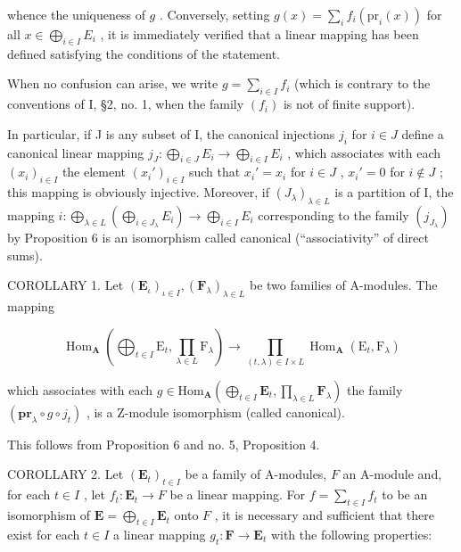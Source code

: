whence the uniqueness of \(g\) . Conversely, setting \(g(x) = \sum_{i} f_i(\mathrm{pr}_i(x))\) for all \(x \in \bigoplus_{i \in I} E_i\) , it is immediately verified that a linear mapping has been defined satisfying the conditions of the statement.

When no confusion can arise, we write \(g = \sum_{i \in I} f_i\) (which is contrary to the conventions of I, §2, no. 1, when the family \((f_i)\) is not of finite support).

In particular, if J is any subset of I, the canonical injections \(j_{i}\) for \(i \in J\) define a canonical linear mapping \(j_{J}: \bigoplus_{i \in J} E_{i} \to \bigoplus_{i \in I} E_{i}\) , which associates with each \((x_{i})_{i \in I}\) the element \((x_{i}')_{i \in I}\) such that \(x_{i}' = x_{i}\) for \(i \in J\) , \(x_{i}' = 0\) for \(i \notin J\) ; this mapping is obviously injective. Moreover, if \((J_{\lambda})_{\lambda \in L}\) is a partition of I, the mapping \(i: \bigoplus_{\lambda \in L} \left( \bigoplus_{i \in J_{\lambda}} E_{i} \right) \to \bigoplus_{i \in I} E_{i}\) corresponding to the family \((j_{J_{\lambda}})\) by Proposition 6 is an isomorphism called canonical (``associativity'' of direct sums).

COROLLARY 1. Let \((\mathbf{E}_{\iota})_{\iota \in I}, (\mathbf{F}_{\lambda})_{\lambda \in L}\) be two families of A-modules. The mapping

\[
\operatorname{Hom} _ {\mathbf {A}} \left(\bigoplus_ {t \in I} \mathrm{E} _ {t}, \prod_ {\lambda \in L} \mathrm{F} _ {\lambda}\right)\rightarrow \prod_ {(t, \lambda) \in I \times L} \operatorname{Hom} _ {\mathbf {A}} \left(\mathrm{E} _ {t}, \mathrm{F} _ {\lambda}\right)\tag{22}
\]

which associates with each \(g \in \mathrm{Hom}_{\mathbf{A}} \left( \bigoplus_{t \in I} \mathbf{E}_t, \prod_{\lambda \in L} \mathbf{F}_\lambda \right)\) the family \((\mathbf{pr}_\lambda \circ g \circ j_t)\) , is a Z-module isomorphism (called canonical).

This follows from Proposition 6 and no. 5, Proposition 4.

COROLLARY 2. Let \((\mathbf{E}_t)_{t \in I}\) be a family of A-modules, \(F\) an A-module and, for each \(t \in I\) , let \(f_t: \mathbf{E}_t \to F\) be a linear mapping. For \(f = \sum_{t \in I} f_t\) to be an isomorphism of \(\mathbf{E} = \bigoplus_{t \in I} \mathbf{E}_t\) onto \(F\) , it is necessary and sufficient that there exist for each \(t \in I\) a linear mapping \(g_t: \mathbf{F} \to \mathbf{E}_t\) with the following properties:

